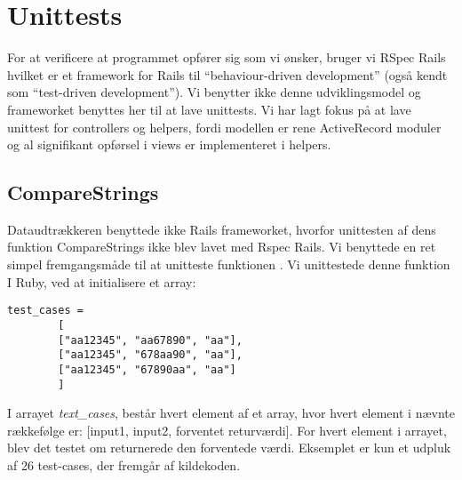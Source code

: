 \section{Unittests}
\label{sec:unittests}
For at verificere at programmet opfører sig som vi ønsker, bruger vi RSpec Rails hvilket er et framework for Rails til ``behaviour-driven development'' (også kendt som ``test-driven development''). Vi benytter ikke denne udviklingsmodel og frameworket benyttes her til at lave unittests.
Vi har lagt fokus på at lave unittest for controllers og helpers, fordi modellen er rene ActiveRecord moduler og al signifikant opførsel i views er implementeret i helpers.

\subsection{CompareStrings}
Dataudtrækkeren benyttede ikke Rails frameworket, hvorfor unittesten af dens funktion CompareStrings ikke blev lavet med Rspec Rails. Vi benyttede en ret simpel fremgangsmåde til at unitteste funktionen . Vi unittestede denne funktion I Ruby, ved at initialisere et array:
\begin{lstlisting}
test_cases = 
		[
		["aa12345", "aa67890", "aa"],
		["aa12345", "678aa90", "aa"],
		["aa12345", "67890aa", "aa"]
		]
\end{lstlisting}
I arrayet \textit{text\_cases}, består hvert element af et array, hvor hvert element i nævnte rækkefølge er: [input1, input2, forventet returværdi].
For hvert element i arrayet, blev det testet om  returnerede den forventede værdi. Eksemplet er kun et udpluk af 26 test-cases, der fremgår af kildekoden.